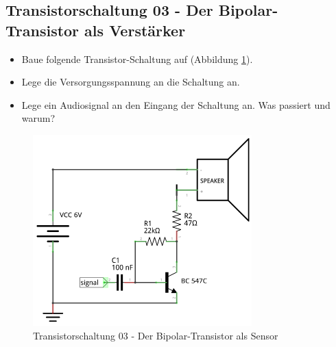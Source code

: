 
\subsection[Der Bipolar-Transistor als Verstärker]{Transistorschaltung 03 - Der Bipolar-Transistor als Verstärker}

\begin{itemize}
\itemsep1pt\parskip0pt
\item Baue folgende Transistor-Schaltung auf (Abbildung \ref{s03}). 
\item Lege die Versorgungsspannung an die Schaltung an.
\item Lege ein Audiosignal an den Eingang der Schaltung an. Was passiert und warum?
\end{itemize}

\begin{figure}[H]
	\centering
	\includegraphics[scale=1.6]{Transistor/Schaltungen/NPN_Verstaerker.pdf}
	\caption{Transistorschaltung 03 - Der Bipolar-Transistor als Sensor}
	\label{s03}
\end{figure}